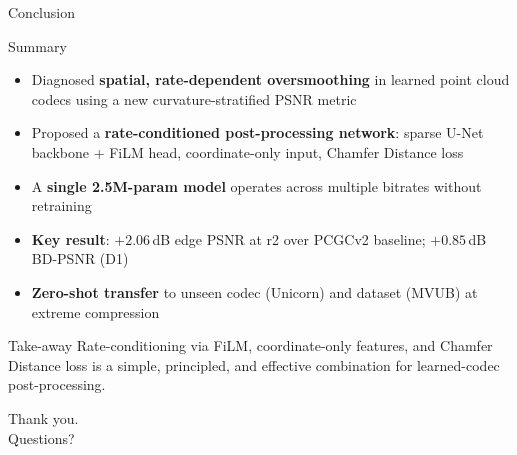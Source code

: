\documentclass[aspectratio=169]{beamer}
\begin{document}
\begin{frame}{Conclusion}
  \begin{block}{Summary}
    \begin{itemize}
      \item Diagnosed \textbf{spatial, rate-dependent oversmoothing} in learned
            point cloud codecs using a new curvature-stratified PSNR metric
      \item Proposed a \textbf{rate-conditioned post-processing network}:
            sparse U-Net backbone + FiLM head, coordinate-only input,
            Chamfer Distance loss
      \item A \textbf{single 2.5M-param model} operates across multiple bitrates
            without retraining
      \item \textbf{Key result}: $+2.06$\,dB edge PSNR at r2 over PCGCv2 baseline;
            $+0.85$\,dB BD-PSNR (D1)
      \item \textbf{Zero-shot transfer} to unseen codec (Unicorn) and dataset
            (MVUB) at extreme compression
    \end{itemize}
  \end{block}
  \vspace{6pt}
  \begin{alertblock}{Take-away}
    Rate-conditioning via FiLM, coordinate-only features, and Chamfer Distance
    loss is a simple, principled, and effective combination for learned-codec
    post-processing.
  \end{alertblock}
\end{frame}

\begin{frame}[standout]
  Thank you.\\[10pt]
  \large Questions?
\end{frame}

\appendix
\end{document}

